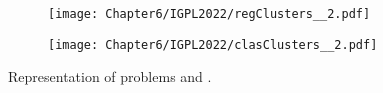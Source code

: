 \begin{figure}[t!]
    \centering
    \begin{subfigure}[b]{0.49\textwidth}
        \centering
        \texttt{[image: Chapter6/IGPL2022/regClusters\_\_2.pdf]}
        \caption{}
        \label{regClusters2}
    \end{subfigure}
    \hfill
    \begin{subfigure}[b]{0.49\textwidth}
        \centering
        \texttt{[image: Chapter6/IGPL2022/clasClusters\_\_2.pdf]}
        \caption{}
        \label{clasClusters2}
    \end{subfigure}
    \caption{Representation of problems  and .}
\end{figure}




